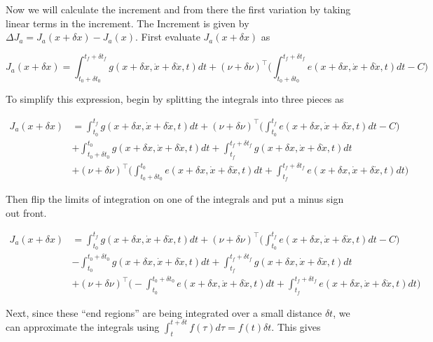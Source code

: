 \documentclass[11pt,letterpaper,onecolumn,notitlepage]{article}
\begin{document}
Now we will calculate the increment and from there the first variation by taking linear terms in the increment.
The Increment is given by $\Delta J_{a}=J_{a}(x+\delta x)-J_{a}(x)$.
First evaluate $J_{a}(x+\delta x)$ as

\begin{equation*}
  J_{a}(x+\delta x)=
  \int_{t_{0}+\delta t_{0}}^{t_{f}+\delta t_{f}}g(x+\delta x,\dot{x}+\delta\dot{x},t)dt+(\nu+\delta\nu)^{\top}\biggr(\int_{t_{0}+\delta t_{0}}^{t_{f}+\delta t_{f}}e(x+\delta x,\dot{x}+\delta\dot{x},t)dt-C\biggr)
\end{equation*}

To simplify this expression, begin by splitting the integrals into three pieces as

\begin{align*}
  J_{a}(x+\delta x)&=
  \int_{t_{0}}^{t_{f}}g(x+\delta x,\dot{x}+\delta\dot{x},t)dt
  +(\nu+\delta\nu)^{\top}\biggr(\int_{t_{0}}^{t_{f}}e(x+\delta x,\dot{x}+\delta\dot{x},t)dt-C\biggr) \\
  &+
  \int_{t_{0}+\delta t_{0}}^{t_{0}}g(x+\delta x,\dot{x}+\delta\dot{x},t)dt+
  \int_{t_{f}}^{t_{f}+\delta t_{f}}g(x+\delta x,\dot{x}+\delta\dot{x},t)dt \\
  &+(\nu+\delta\nu)^{\top}\biggr(
  \int_{t_{0}+\delta t_{0}}^{t_{0}}e(x+\delta x,\dot{x}+\delta\dot{x},t)dt+
  \int_{t_{f}}^{t_{f}+\delta t_{f}}e(x+\delta x,\dot{x}+\delta\dot{x},t)dt\biggr)
\end{align*}

Then flip the limits of integration on one of the integrals and put a minus sign out front.

\begin{align*}
  J_{a}(x+\delta x)&=
  \int_{t_{0}}^{t_{f}}g(x+\delta x,\dot{x}+\delta\dot{x},t)dt
  +(\nu+\delta\nu)^{\top}\biggr(\int_{t_{0}}^{t_{f}}e(x+\delta x,\dot{x}+\delta\dot{x},t)dt-C\biggr) \\
  &-
  \int_{t_{0}}^{t_{0}+\delta t_{0}}g(x+\delta x,\dot{x}+\delta\dot{x},t)dt+
  \int_{t_{f}}^{t_{f}+\delta t_{f}}g(x+\delta x,\dot{x}+\delta\dot{x},t)dt \\
  &+(\nu+\delta\nu)^{\top}\biggr(
  -\int_{t_{0}}^{t_{0}+\delta t_{0}}e(x+\delta x,\dot{x}+\delta\dot{x},t)dt+
  \int_{t_{f}}^{t_{f}+\delta t_{f}}e(x+\delta x,\dot{x}+\delta\dot{x},t)dt\biggr)
\end{align*}

Next, since these ``end regions'' are being integrated over a small distance $\delta t$, we can approximate the integrals using $\int_{t}^{t+\delta t}f(\tau)d\tau=f(t)\delta t$.
This gives
\end{document}
